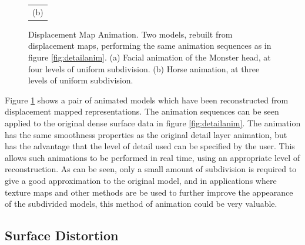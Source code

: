 \begin{figure}
\begin{center}
\begin{tabular}{cc}
\multicolumn{2}{c}{(b)}
\end{tabular}
\caption[Displacement Map Animation]{\label{fig:dispmapanim} Displacement Map Animation. Two models, rebuilt from displacement maps, performing the same animation sequences as in figure \ref{fig:detailanim}. (a) Facial animation of the Monster head, at four levels of uniform subdivision. (b) Horse animation, at three levels of uniform subdivision.}
\end{center}
\end{figure}

Figure \ref{fig:dispmapanim} shows a pair of animated models which have been reconstructed from displacement mapped representations. The animation sequences can be seen applied to the original dense surface data in figure \ref{fig:detailanim}. The animation has the same smoothness properties as the original detail layer animation, but has the advantage that the level of detail used can be specified by the user. This allows such animations to be performed in real time, using an appropriate level of reconstruction. As can be seen, only a small amount of subdivision is required to give a good approximation to the original model, and in applications where texture maps and other methods are be used to further improve the appearance of the subdivided models, this method of animation could be very valuable.

\subsection{\label{sec:dispmapanim:animation:distortion}Surface Distortion}

